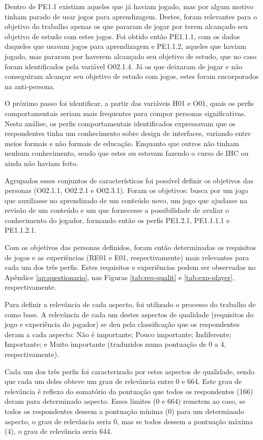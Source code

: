 Dentro de PE1.1 existiam aqueles que já haviam jogado, mas por algum motivo tinham parado de usar jogos para aprendizagem. Destes, foram relevantes para o objetivo do trabalho apenas os que pararam de jogar por terem alcançado seu objetivo de estudo com estes jogos. Foi obtido então PE1.1.1, com  os dados daqueles que usavam jogos para aprendizagem e PE1.1.2, aqueles que haviam jogado, mas pararam por haverem alcançado seu objetivo de estudo, que no caso foram identificados pela variável O02.1.4. Já os que deixaram de jogar e não conseguiram alcançar seu objetivo de estudo com jogos, estes foram encorporados na anti-persona.

O próximo passo foi identificar, a partir das variáveis H01 e O01, quais os perfis comportamentais seriam mais frequentes para compor personas significativas. Nesta análise, os perfis comportamentais identificados expressavam que os respondentes tinha um conhecimento sobre design de interfaces, variando entre meios formais e não formais de educação. Enquanto que outros não tinham nenhum conhecimento, sendo que estes ou estavam fazendo o curso de IHC ou ainda não haviam feito.

Agrupados esses conjuntos de características foi possível definir os objetivos das personas (O02.1.1, O02.2.1 e O02.3.1). Foram os objetivos: busca por um jogo que auxiliasse no aprendizado de um conteúdo novo, um jogo que ajudasse na revisão de um conteúdo e um que fornecesse a possibilidade de avaliar o conhecimento do jogador, formando então os perfis PE1.2.1, PE1.1.1.1 e PE1.1.2.1. 

Com os objetivos das personas definidos, foram então determinadas os requisitos de jogos e as experiências (RE01 e E01, respectivamente) mais relevantes para cada um dos três perfis. Estes requisitos e experiências podem ser observadas no Apêndice \ref{ap:questionario}, nas Figuras \ref{tab:req-qualit} e \ref{tab:exp-player}, respectivamente.

Para definir a relevância de cada aspecto, foi utilizado o processo do trabalho de  como base. A relevância de cada um destes aspectos de qualidade (requisitos do jogo e experiência do jogador) se deu pela classificação que os respondentes deram a cada aspecto: Não é importante; Pouco importante; Indiferente; Importante; e Muito importante (traduzidos numa pontuação de 0 a 4, respectivamente).

Cada um dos três perfis foi caracterizado por estes aspectos de qualidade, sendo que cada um deles obteve um grau de relevância entre 0 e 664. Este grau de relevância é reflexo do somatório da pontuação que todos os respondentes (166) deram para determinado aspecto. Esses limites (0 e 664) remetem ao caso, se todos os respondentes dessem a pontuação mínima (0) para um determinado aspecto, o grau de relevância seria 0, mas se todos dessem a pontuação máxima (4), o grau de relevância seria 644.

